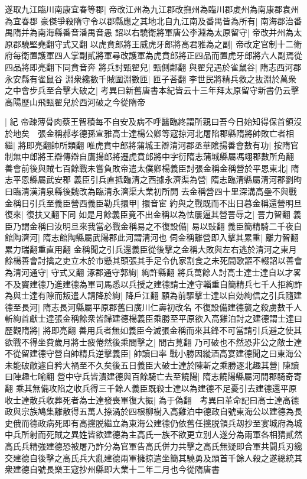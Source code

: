 遂取九江臨川南康宜春等郡|{
	帝改江州為九江郡改撫州為臨川郡䖍州為南康郡袁州為宜春郡}
豪傑爭殺隋守令以郡縣應之其地北自九江南及番禺皆為所有|{
	南海郡治番禺隋并為南海縣番音潘禺音愚}
詔以右驍衛將軍唐公李淵為太原留守|{
	帝改并州為太原郡驍堅堯翻守式又翻}
以虎賁郎將王威虎牙郎將高君雅為之副|{
	帝改定官制十二衛府每衛置護軍四人掌副貳將軍尋改護軍為虎賁郎將正四品而置虎牙郎將六人副焉從四品將即亮翻下同賁音奔}
將兵討甄翟兒|{
	甄側鄰翻}
與翟兒遇於雀鼠谷|{
	隋志西河郡永安縣有雀鼠谷}
淵衆纔數千賊圍淵數匝|{
	匝子荅翻}
李世民將精兵救之抜淵於萬衆之中會步兵至合擊大破之|{
	考異曰新舊唐書本紀皆云十三年拜太原留守新書仍云擊高陽歷山飛甄翟兒於西河破之今從隋帝}


|{
	紀}
帝疎薄骨肉蔡王智積每不自安及病不呼醫臨終謂所親曰吾今日始知得保首領沒於地矣　張金稱郝孝德孫宣雅高士達楊公卿等寇掠河北屠陷郡縣隋將帥敗亡者相繼|{
	將即亮翻帥所類翻}
唯虎賁中郎將蒲城王辯清河郡丞華隂揚善會數有功|{
	按隋官制無中郎將王辯傳辯自鷹揚郎將遷虎賁郎將中字衍隋志蒲城縣屬馮翊郡數所角翻}
善會前後與賊七百餘戰未嘗負敗帝遣太僕卿楊義臣討張金稱金稱營於平恩東北|{
	隋志平恩縣屬武安郡}
義臣引兵直抵臨清之西據永濟渠為營|{
	隋志臨清縣屬清河郡劉昫曰臨清漢清泉縣後魏改為臨清永濟渠大業初所開}
去金稱營四十里深溝高壘不與戰金稱日引兵至義臣營西義臣勒兵擐甲|{
	擐音宦}
約與之戰既而不出日暮金稱還營明旦復來|{
	復扶又翻下同}
如是月餘義臣竟不出金稱以為怯屢逼其營詈辱之|{
	詈力智翻}
義臣乃謂金稱曰汝明旦來我當必戰金稱易之不復設備|{
	易以䜴翻}
義臣簡精騎二千夜自館陶濟河|{
	隋志館陶縣屬武陽郡此河謂清河也}
伺金稱離營即入擊其累重|{
	離力智翻累力瑞翻重直用翻}
金稱聞之引兵還義臣從後擊之金稱大敗與左右逃於清河之東月餘楊善會討擒之吏立木於市懸其頭張其手足令仇家割食之未死間歌謳不輟詔以善會為清河通守|{
	守式又翻}
涿郡通守郭絢|{
	絢許縣翻}
將兵萬餘人討高士達士達自以才畧不及竇建德乃進建德為軍司馬悉以兵授之建德請士達守輜重自簡精兵七千人拒絢詐為與士達有隙而叛遣人請降於絢|{
	降戶江翻}
願為前驅擊士達以自効絢信之引兵隨建德至長河|{
	隋志長河縣屬平原郡舊曰廣川仁壽初改名}
不復設備建德襲之殺虜數千人斬絢首獻士達張金稱餘衆皆歸建德楊義臣乘勝至平原欲入高雞泊討之建德謂士達曰歷觀隋將|{
	將即亮翻}
善用兵者無如義臣今滅張金稱而來其鋒不可當請引兵避之使其欲戰不得坐費歲月將士疲倦然後乘間擊之|{
	間古莧翻}
乃可破也不然恐非公之敵士達不從留建德守營自帥精兵逆擊義臣|{
	帥讀曰率}
戰小勝因縱酒高宴建德聞之曰東海公未能破敵遽自矜大禍至不久矣後五日義臣大破士達於陳斬之乘勝逐北趣其營|{
	陳讀曰陣趣七喻翻}
營中守兵皆潰建德與百餘騎亡去至饒陽|{
	隋志饒陽縣屬河間郡騎奇寄翻}
乘其無備攻陷之收兵得三千餘人義臣既殺士達以為建德不足憂引去建德還平原收士達散兵收葬死者為士達發喪軍復大振|{
	為于偽翻　考異曰革命記曰高士達高德政與宗族鳩集離散得五萬人捺渦於四根柳樹入高雞泊中德政自號東海公以建德為長史俄而德政病死即有高攩脱繼立為東海公建德仍依舊任攩脱領兵刼抄至宴城府為城中兵所射而死賊之異姓皆欲建德為主高氏一族不欲更立别人遂分為兩軍各相猜貳然高氏兵精強建德恐被屠乃詐分為官軍告高氏併力共擊之高氏無疑即合軍共闘兵刃纔交建德自後擊之高氏兵大亂建德兩軍擁掠遣坐簡其驍勇及頭首千餘人殺之遂總統其衆建德自號長樂王寇抄州縣即大業十二年二月也今從隋唐書}
